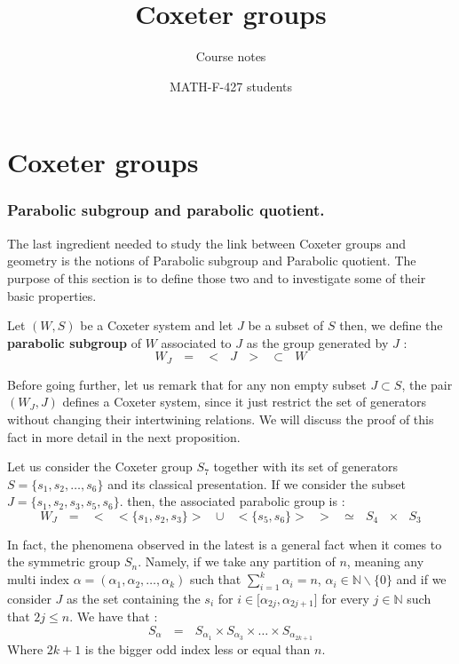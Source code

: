 \documentclass[envcountsame,envcountchap]{svmono}
\newcommand{\N}{\mathbb N}
\newcommand{\tg}[1]{\textbf{#1}}
\newcommand{\sub}{\subset}
\newcommand{\lb}{\lbrack}
\newcommand{\rb}{\rbrack}
\newcommand{\s}[2]{\sum\limits_{#1}^{#2}}
\newcommand{\qq}{\text{ }}
\begin{document}
\author{MATH-F-427 students}
\title{Coxeter groups}
\subtitle{Course notes}
\maketitle

\frontmatter%

\tableofcontents


\mainmatter%
\part{Coxeter groups}

\section{Parabolic subgroup and parabolic quotient.}
The last ingredient needed to study the link between Coxeter groups and geometry is the notions of Parabolic subgroup and Parabolic quotient. The purpose of this section is to define those two and to investigate some of their basic properties.

\begin{definition}
	Let $(W,S)$ be a Coxeter system and let $J$ be a subset of $S$ then, we define the \tg{parabolic subgroup} of $W$ associated to $J$ as the group generated by $J$ :
	\begin{equation}
	W_J\qq=\qq <\qq J\qq >\qq \sub \qq W
	\end{equation} 
\end{definition}
\begin{remark}
	Before going further, let us remark that for any non empty subset $J\sub S$, the pair $(W_J,J)$ defines a Coxeter system, since it just restrict the set of generators without changing their intertwining relations. We will discuss the proof of this fact in more detail in the next proposition.
\end{remark}
\begin{example}
	Let us consider the Coxeter group $S_7$ together with its set of generators  $S=\{s_1,s_2,\dots, s_6\}$ and its classical presentation. If we consider the subset $J=\{s_1,s_2,s_3,s_5,s_6\}$. then, the associated parabolic group is :
	\begin{equation}
	W_J\qq=\qq <\qq <\{s_1,s_2,s_3\}>\qq \cup \qq <\{s_5,s_6\}>\qq >\qq \simeq\qq S_4\qq \times \qq S_3
	\end{equation}
\end{example}
In fact, the phenomena observed in the latest is a general fact when it comes to the symmetric group $S_n$. Namely, if we take any partition of $n$, meaning any multi index $\alpha=(\alpha_1,\alpha_2,\dots, \alpha_k)$ such that $\s{i=1}{k}\alpha_i=n$, $\alpha_i\in \N\backslash\{0\}$ and if we consider $J$ as the set containing the $s_i$ for $i\in \lb \alpha_{2j},\alpha_{2j+1}\rb$ for every $j\in \N$ such that $2j\leq n$. We have that :
\begin{equation}
S_\alpha\qq=\qq S_{\alpha_1}\times S_{\alpha_3}\times \dots \times S_{\alpha_{2k+1}}
\end{equation}
Where $2k+1$ is the bigger odd index less or equal than $n$.
\end{document}
